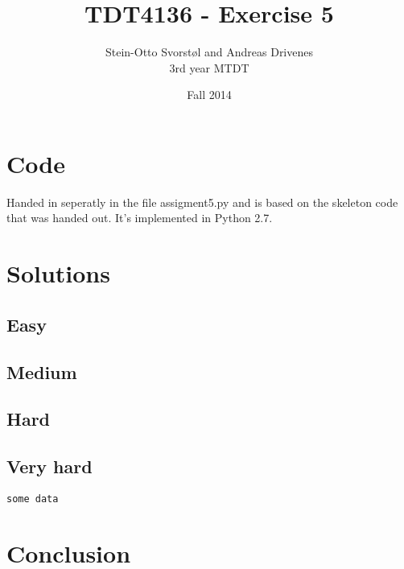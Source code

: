 \documentclass[11pt,a4paper]{article}
\author{Stein-Otto Svorstøl and Andreas Drivenes
\\3rd year MTDT}
\title{TDT4136 - Exercise 5}
\date{Fall 2014}
\begin{document}
\maketitle
\section{Code}
Handed in seperatly in the file assigment5.py and is based on the skeleton code that was handed out. It's implemented in Python 2.7.

\section{Solutions}
\subsection{Easy}
\subsection{Medium}
\subsection{Hard}
\subsection{Very hard}
\begin{lstlisting}
some data
\end{lstlisting}

\section{Conclusion}
\end{document}
